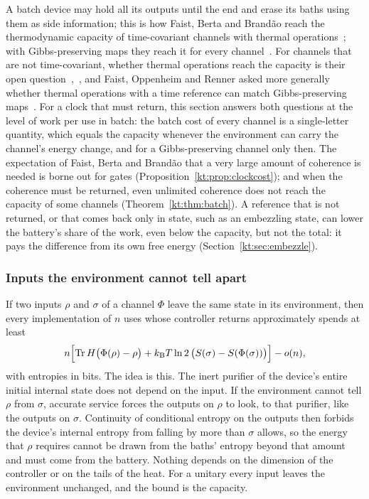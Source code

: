A batch device may hold all its outputs until the end and erase its baths using them as side information; this is how Faist, Berta and Brand\~ao reach the thermodynamic capacity of time-covariant channels with thermal operations~\cite[Sec.~7]{FBB21}; with Gibbs-preserving maps they reach it for every channel~\cite[Sec.~6]{FBB21}. For channels that are not time-covariant, whether thermal operations reach the capacity is their open question~\cite{FBB19},~\cite[Sec.~9]{FBB21}, and Faist, Oppenheim and Renner asked more generally whether thermal operations with a time reference can match Gibbs-preserving maps~\cite{FOR15}. For a clock that must return, this section answers both questions at the level of work per use in batch: the batch cost of every channel is a single-letter quantity, which equals the capacity whenever the environment can carry the channel's energy change, and for a Gibbs-preserving channel only then. The expectation of Faist, Berta and Brand\~ao that a very large amount of coherence is needed is borne out for gates (Proposition~\ref{kt:prop:clockcost}); and when the coherence must be returned, even unlimited coherence does not reach the capacity of some channels (Theorem~\ref{kt:thm:batch}). A reference that is not returned, or that comes back only in state, such as an embezzling state, can lower the battery's share of the work, even below the capacity, but not the total: it pays the difference from its own free energy (Section~\ref{kt:sec:embezzle}).

\subsubsection{Inputs the environment cannot tell apart}

If two inputs $\rho$ and $\sigma$ of a channel $\Phi$ leave the same state in its environment, then every implementation of $n$ uses whose controller returns approximately spends at least
\[
n\Bigl[\operatorname{Tr} H\bigl(\Phi(\rho)-\rho\bigr)+k_{\mathrm B} T\ln2\,\bigl(S(\sigma)-S(\Phi(\sigma))\bigr)\Bigr]-o(n),
\]
with entropies in bits. The idea is this. The inert purifier of the device's entire initial internal state does not depend on the input. If the environment cannot tell $\rho$ from $\sigma$, accurate service forces the outputs on $\rho$ to look, to that purifier, like the outputs on $\sigma$. Continuity of conditional entropy on the outputs then forbids the device's internal entropy from falling by more than $\sigma$ allows, so the energy that $\rho$ requires cannot be drawn from the baths' entropy beyond that amount and must come from the battery. Nothing depends on the dimension of the controller or on the tails of the heat. For a unitary every input leaves the environment unchanged, and the bound is the capacity.

